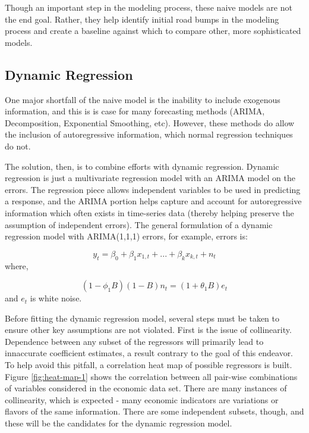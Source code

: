 \documentclass[12pt,letterpaper,toc=flat,oneside]{report}
\theoremstyle{definition}
\theoremstyle{definition}
\theoremstyle{definition}
\theoremstyle{remark}
\begin{document}
Though an important step in the modeling process, these naive models are
not the end goal. Rather, they help identify initial road bumps in the
modeling process and create a baseline against which to compare other,
more sophisticated models.

\hypertarget{dynamic-regression}{%
\subsection{Dynamic Regression}\label{dynamic-regression}}

One major shortfall of the naive model is the inability to include
exogenous information, and this is is case for many forecasting methods
(ARIMA, Decomposition, Exponential Smoothing, etc). However, these
methods do allow the inclusion of autoregressive information, which
normal regression techniques do not.

The solution, then, is to combine efforts with dynamic regression.
Dynamic regression is just a multivariate regression model with an ARIMA
model on the errors. The regression piece allows independent variables
to be used in predicting a response, and the ARIMA portion helps capture
and account for autoregressive information which often exists in
time-series data (thereby helping preserve the assumption of independent
errors). The general formulation of a dynamic regression model with
ARIMA(1,1,1) errors, for example, errors is:

\[ y_t = \beta_0 + \beta_1x_{1,t} + ... + \beta_kx_{k,t} + n_t\] where,

\[ (1-\phi_1B)(1-B)n_t = (1+\theta_1B)e_t \] and \(e_t\) is white noise.

Before fitting the dynamic regression model, several steps must be taken
to ensure other key assumptions are not violated. First is the issue of
collinearity. Dependence between any subset of the regressors will
primarily lead to innaccurate coefficient estimates, a result contrary
to the goal of this endeavor. To help avoid this pitfall, a correlation
heat map of possible regressors is built. Figure \ref{fig:heat-map-1}
shows the correlation between all pair-wise combinations of variables
considered in the economic data set. There are many instances of
collinearity, which is expected - many economic indicators are
variations or flavors of the same information. There are some
independent subsets, though, and these will be the candidates for the
dynamic regression model.
\end{document}
